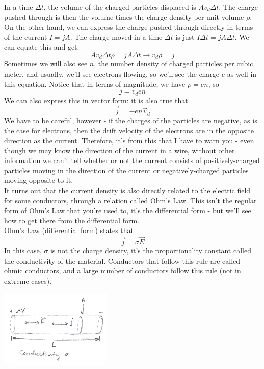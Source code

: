 In a time $\Delta t$, the volume of the charged particles displaced is $Av_d \Delta t$. The charge pushed through is then the volume times the charge density per unit volume $\rho$. On the other hand, we can express the charge pushed through directly in terms of the current $I = jA$. The charge moved in a time $\Delta t$ is just $I\Delta t = jA \Delta t$. We can equate this and get:
\[
	Av_d\Delta t \rho = jA\Delta t \rightarrow 	v_d \rho = j 
\]
Sometimes we will also see $n$, the number density of charged particles per cubic meter, and usually, we'll see electrons flowing, so we'll see the charge $e$ as well in this equation. Notice that in terms of magnitude, we have $\rho = en$, so 
\[
	j = v_d en
\]
We can also express this in vector form: it is also true that 
\[
	\vec j = -en \vec v_d
\]
We have to be careful, however - if the charges of the particles are negative, as is the case for electrons, then the drift velocity of the electrons are in the opposite direction as the current. Therefore, it's from this that I have to warn you - even though we may know the direction of the current in a wire, without other information we can't tell whether or not the current consists of positively-charged particles moving in the direction of the current or negatively-charged particles moving opposite to it. \\
It turns out that the current density is also directly related to the electric field for some conductors, through a relation called Ohm's Law. This isn't the regular form of Ohm's Law that you're used to, it's the differential form - but we'll see how to get there from the differential form. \\
Ohm's Law (differential form) states that 
\[
	\vec j = \sigma \vec E
\]
In this case, $\sigma$ is not the charge density, it's the proportionality constant called the conductivity of the material. Conductors that follow this rule are called ohmic conductors, and a large number of conductors follow this rule (not in extreme cases). \\
\begin{center}
	\includegraphics[width=0.4\textwidth]{images/em/ohmic-conductor.png}\\
\end{center}
